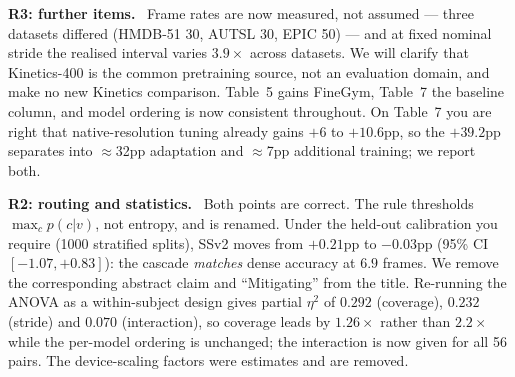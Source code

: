 \documentclass[runningheads]{llncs}
\newcommand{\R}[1]{\textbf{R#1}}
\newcommand{\head}[1]{\vspace{1pt}\noindent\textbf{#1}\ }
\begin{document}
\head{\R{3}: further items.}
Frame rates are now measured, not assumed --- three datasets differed
(HMDB-51 30, AUTSL 30, EPIC 50) --- and at fixed nominal stride the realised
interval varies $3.9\times$ across datasets. We will clarify that Kinetics-400
is the common pretraining source, not an evaluation domain, and make no new
Kinetics comparison. Table~5 gains FineGym, Table~7 the baseline
column, and model ordering is now consistent throughout. On Table~7 you are
right that native-resolution tuning already gains $+6$ to $+10.6$pp, so the
$+39.2$pp separates into $\approx$32pp adaptation and $\approx$7pp additional
training; we report both.

\head{\R{2}: routing and statistics.}
Both points are correct. The rule thresholds $\max_c p(c|v)$, not entropy, and
is renamed. Under the held-out calibration you require (1000 stratified splits),
SSv2 moves from $+0.21$pp to $-0.03$pp (95\% CI $[-1.07,+0.83]$): the cascade
\emph{matches} dense accuracy at $6.9$ frames. We remove the corresponding
abstract claim and ``Mitigating'' from the title. Re-running the ANOVA as a
within-subject design gives partial $\eta^2$ of $0.292$ (coverage), $0.232$
(stride) and $0.070$ (interaction), so coverage leads by $1.26\times$ rather
than $2.2\times$ while the per-model ordering is unchanged; the interaction is
now given for all 56 pairs. The device-scaling factors were estimates and are
removed.
\end{document}
